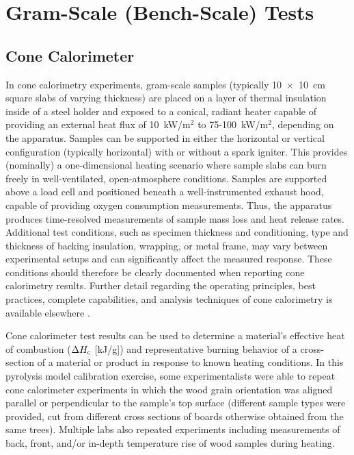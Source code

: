 \documentclass{book}
\begin{document}

\section{Gram-Scale (Bench-Scale) Tests}
\label{g_tests}
\subsection{Cone Calorimeter}
\label{g_tests_cone}
In cone calorimetry experiments, gram-scale samples (typically 10~$\times$~10~cm square slabs of varying thickness) are placed on a layer of thermal insulation inside of a steel holder and exposed to a conical, radiant heater capable of providing an external heat flux of 10~kW/m$^2$ to 75-100~kW/m$^2$, depending on the apparatus. Samples can be supported in either the horizontal or vertical configuration (typically horizontal) with or without a spark igniter.  This provides (nominally) a one-dimensional heating scenario where sample slabs can burn freely in well-ventilated, open-atmosphere conditions. Samples are supported above a load cell and positioned beneath a well-instrumented exhaust hood, capable of providing oxygen consumption measurements. Thus, the apparatus produces time-resolved measurements of sample mass loss and heat release rates. Additional test conditions, such as specimen thickness and conditioning, type and thickness of backing insulation, wrapping, or metal frame, may vary between experimental setups and can significantly affect the measured response. These conditions should therefore be clearly documented when reporting cone calorimetry results. Further detail regarding the operating principles, best practices, complete capabilities, and analysis techniques of cone calorimetry is available elsewhere \cite{babrauskas1984development, SFPEHandbookCone, astm1354standard, twilley1988user}.

Cone calorimeter test results can be used to determine a material's effective heat of combustion ($\Delta H_{\rm{c}}$ [kJ/g]) and representative burning behavior of a cross-section of a material or product in response to known heating conditions. In this pyrolysis model calibration exercise, some experimentalists were able to repeat cone calorimeter experiments in which the wood grain orientation was aligned parallel or perpendicular to the sample's top surface (different sample types were provided, cut from different cross sections of boards otherwise obtained from the same trees). Multiple labs also repeated experiments including measurements of back, front, and/or in-depth temperature rise of wood samples during heating.
\end{document}
